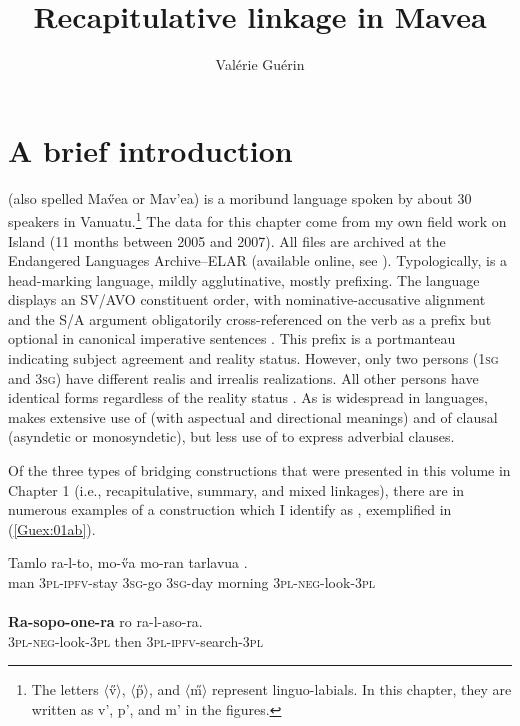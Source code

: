 \documentclass[output=paper]{LSP/langsci}
\author{Valérie Guérin\affiliation{James Cook University}}
\title{Recapitulative linkage in Mavea}
\begin{document}
\label{ch:8}

\section{A brief introduction} 
\label{Gusec:Introduction}
 (also spelled Ma\H{v}ea or Mav'ea) is a moribund  language spoken by about 30 speakers in Vanuatu.\footnote{The letters $\langle$\H{v}$\rangle$, $\langle$\H{p}$\rangle$, and $\langle$\H{m}$\rangle$ represent linguo-labials. In this chapter, they are written as v', p', and m' in the figures.} The data for this chapter come from my own field work on  Island (11 months between 2005 and 2007). All files are archived at the Endangered Languages Archive--ELAR (available online, see \citealt{guerin06}). Typologically,  is a head-marking language, mildly agglutinative, mostly prefixing. The language displays an SV\slash AVO constituent order, with nominative-accusative alignment and the S/A argument obligatorily cross-referenced on the verb as a prefix but optional in canonical imperative sentences \citep[][236]{guerin11}. This prefix is a portmanteau indicating subject agreement and reality status. However, only two persons (\textsc{1sg} and \textsc{3sg}) have different realis and irrealis realizations. All other persons have identical forms regardless of the reality status \citep[][61]{guerin11}. As is widespread in  languages,  makes extensive use of  (with aspectual and directional meanings) and of clausal  (asyndetic or monosyndetic), but less use of  to express adverbial clauses. 

Of the three types of bridging constructions that were presented in this volume in Chapter 1 (i.e., recapitulative, summary, and mixed linkages), there are in  numerous examples of a construction which I identify as , exemplified in (\ref{Guex:01ab}). 

\begin{exe}
\ex \label{Guex:01ab}
\begin{xlist}
\ex \label{Guex:01a}
\gll Tamlo   ra-l-to,            mo-\H{v}a    mo-ran      tarlavua  \underline{}.\\
man     \textsc{3pl}-\textsc{ipfv}-stay   \textsc{3sg}-go     \textsc{3sg}-day   morning  \textsc{3pl-neg}-look-\textsc{3pl}\\
\glt {}\\
\ex \label{Guex:01b}
\gll \textbf{Ra-sopo-one-ra} ro      ra-l-aso-ra.\\     	       
    \textsc{3pl-neg}-look-\textsc{3pl}   then  \textsc{3pl-ipfv}-search-\textsc{3pl}\\
\glt {} 
\end{xlist}
\end{exe}
\end{document}
